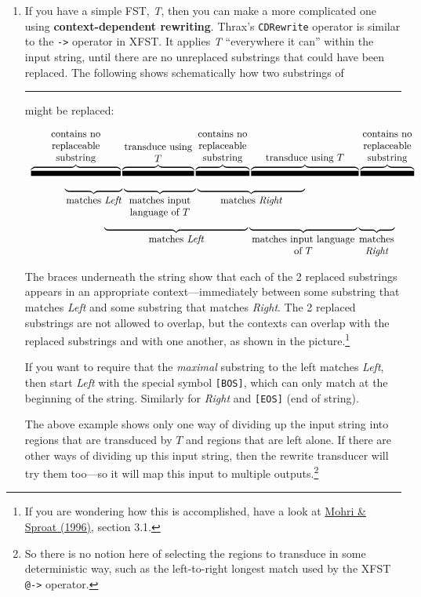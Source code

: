 \documentclass[11pt]{article}
\makeatletter
\newcommand{\atsign}{{\makeatletter @\makeatother}}
\newcommand{\overrule}[3]{\overbrace{\rule{#1}{#2}}^{\parbox[b]{#1}{\centering #3}}}
\newcommand{\underrule}[3]{\underbrace{\rule{#1}{#2}}_{\parbox[t]{#1}{\centering #3}}}
\makeatother
\begin{document}
\begin{enumerate}[resume]
\item \label{q:rewrite-cd} If you have a simple FST, {\em T}, then you can make a more
  complicated one using {\bf context-dependent rewriting}.
  Thrax's {\tt CDRewrite} operator is similar to the {\tt ->}
  operator in XFST.  It applies {\em T} ``everywhere it can'' within
  the input string, until there are no unreplaced substrings that
  could have been replaced.  The following shows schematically how two
  substrings of \rule{0.5in}{5pt} might be replaced:

  $$\begin{array}{l}
    \overrule{1.25in}{5pt}{contains no replaceable substring}
    \overrule{1in}{5pt}{transduce using $T$}
    \overrule{0.75in}{5pt}{contains no replaceable substring}
    \overrule{1.5in}{5pt}{transduce using $T$}
    \overrule{0.75in}{5pt}{contains no replaceable substring}
    \\
    \rule{0.45in}{0pt}
    \underrule{0.8in}{0pt}{matches {\em Left}}
    \underrule{1in}{0pt}{matches input language of $T$}
    \underrule{1.5in}{0pt}{matches {\em Right}}
    \\
    \rule{1in}{0pt}
    \underrule{2in}{0pt}{matches {\em Left}}
    \underrule{1.5in}{0pt}{matches input language of $T$}
    \underrule{0.5in}{0pt}{matches {\em Right}} \\
  \end{array}$$

  The braces underneath the string show that each of the 2 replaced
  substrings appears in an appropriate context---immediately between
  some substring that matches {\em Left} and some substring that matches
  {\em Right}.  The 2 replaced substrings are not allowed to
  overlap, but the contexts can overlap with the replaced substrings
  and with one another, as shown in the picture.\footnote{If you are wondering how this is
    accomplished, have a look at
    \href{http://aclweb.org/anthology/P/P96/P96-1031.pdf}{Mohri \&
      Sproat (1996)}, section 3.1.}

  If you want to require that the {\em maximal} substring to the
  left matches {\em Left}, then start {\em Left} with the special
  symbol {\tt [BOS]}, which can only match at the beginning of the
  string.  Similarly for {\em Right} and {\tt [EOS]} (end of string).

  The above example shows only one way of dividing up the input
  string into regions that are transduced by $T$ and regions that
  are left alone.  If there are other ways of dividing up this input
  string, then the rewrite transducer will try them too---so it will
  map this input to multiple outputs.\footnote{So there is no notion
    here of selecting the regions to transduce in some deterministic
    way, such as the left-to-right longest match used by the XFST
    \texttt{\atsign->} operator.}


\end{enumerate}
\end{document}
